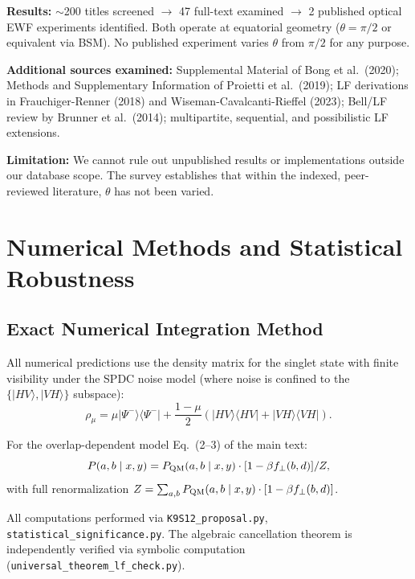 \documentclass[12pt]{article}
\begin{document}
\textbf{Results:} $\sim$200 titles screened $\to$ 47 full-text examined $\to$ 2 published optical EWF experiments identified. Both operate at equatorial geometry ($\theta = \pi/2$ or equivalent via BSM). No published experiment varies $\theta$ from $\pi/2$ for any purpose.

\textbf{Additional sources examined:} Supplemental Material of Bong et al.\ (2020); Methods and Supplementary Information of Proietti et al.\ (2019); LF derivations in Frauchiger-Renner (2018) and Wiseman-Cavalcanti-Rieffel (2023); Bell/LF review by Brunner et al.\ (2014); multipartite, sequential, and possibilistic LF extensions.

\textbf{Limitation:} We cannot rule out unpublished results or implementations outside our database scope. The survey establishes that within the indexed, peer-reviewed literature, $\theta$ has not been varied.

\section{Numerical Methods and Statistical Robustness}
\label{sec:S2}

\subsection{Exact Numerical Integration Method}

All numerical predictions use the density matrix for the singlet state with finite visibility under the SPDC noise model (where noise is confined to the $\{|HV\rangle, |VH\rangle\}$ subspace):
\begin{equation}
\rho_\mu = \mu|\Psi^-\rangle\langle\Psi^-| + \frac{1-\mu}{2}(|HV\rangle\langle HV| + |VH\rangle\langle VH|).
\end{equation}

For the overlap-dependent model Eq.~(2--3) of the main text:
\begin{equation}
P(a,b \mid x,y) = P_{\rm QM}(a,b \mid x,y) \cdot [1 - \beta f_\perp(b,d)] / Z,
\end{equation}
with full renormalization $Z = \sum_{a,b} P_{\rm QM}(a,b \mid x,y) \cdot [1 - \beta f_\perp(b,d)]$.

All computations performed via \texttt{K9S12\_proposal.py}, \texttt{statistical\_significance.py}. The algebraic cancellation theorem is independently verified via symbolic computation (\texttt{universal\_theorem\_lf\_check.py}).
\end{document}
